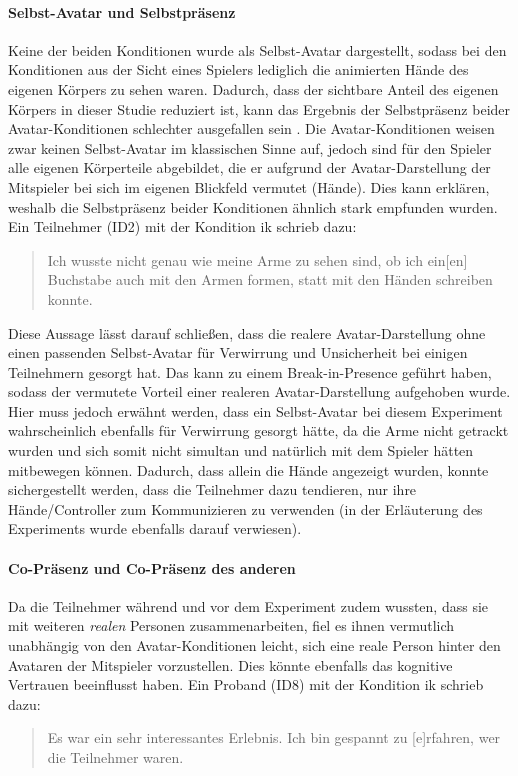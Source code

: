 \documentclass[a4paper,11pt]{article}%
\renewcommand{\\}{\vspace*{0.5\baselineskip} \newline}
\begin{document}
{{\paragraph{Selbst-Avatar und Selbstpräsenz}
Keine der beiden Konditionen wurde als Selbst-Avatar dargestellt, sodass bei den Konditionen aus der Sicht eines Spielers lediglich die animierten Hände des eigenen Körpers zu sehen waren. 
Dadurch, dass der sichtbare Anteil des eigenen Körpers in dieser Studie reduziert ist, kann das Ergebnis der Selbstpräsenz beider Avatar-Konditionen schlechter ausgefallen sein \citep[421-427]{construal2014connected}.
Die Avatar-Konditionen weisen zwar keinen Selbst-Avatar im klassischen Sinne auf, jedoch sind für den Spieler alle eigenen Körperteile abgebildet, die er aufgrund der Avatar-Darstellung der Mitspieler bei sich im eigenen Blickfeld vermutet (Hände). Dies kann erklären, weshalb die Selbstpräsenz beider Konditionen ähnlich stark empfunden wurden. Ein Teilnehmer (ID2) mit der Kondition \ac{ik} schrieb dazu:
\begin{quote}
\glqq{}Ich wusste nicht genau wie meine Arme zu sehen sind, ob ich ein[en] Buchstabe auch mit den Armen formen, statt mit den Händen schreiben konnte.\dq{}
\end{quote}
Diese Aussage lässt darauf schließen, dass die realere Avatar-Darstellung ohne einen passenden Selbst-Avatar für Verwirrung und Unsicherheit bei einigen Teilnehmern gesorgt hat. Das kann zu einem Break-in-Presence geführt haben, sodass der vermutete Vorteil einer realeren Avatar-Darstellung aufgehoben wurde. Hier muss jedoch erwähnt werden, dass ein Selbst-Avatar bei diesem Experiment wahrscheinlich ebenfalls für Verwirrung gesorgt hätte, da die Arme nicht getrackt wurden und sich somit nicht simultan und natürlich mit dem Spieler hätten mitbewegen können. Dadurch, dass allein die Hände angezeigt wurden, konnte sichergestellt werden, dass die Teilnehmer dazu tendieren, nur ihre Hände/Controller zum Kommunizieren zu verwenden (in der Erläuterung des Experiments wurde ebenfalls darauf verwiesen).

\paragraph{Co-Präsenz und Co-Präsenz des anderen} Da die Teilnehmer während und vor dem Experiment zudem wussten, dass sie mit weiteren \textit{realen} Personen zusammenarbeiten, fiel es ihnen vermutlich unabhängig von den Avatar-Konditionen leicht, sich eine reale Person hinter den Avataren der Mitspieler vorzustellen. Dies könnte ebenfalls das kognitive Vertrauen beeinflusst haben. Ein Proband (ID8) mit der Kondition \ac{ik} schrieb dazu:
\begin{quote}
\glqq{}Es war ein sehr interessantes Erlebnis. Ich bin gespannt zu [e]rfahren, wer die Teilnehmer waren.\dq{}
\end{quote}

}}
\end{document}

